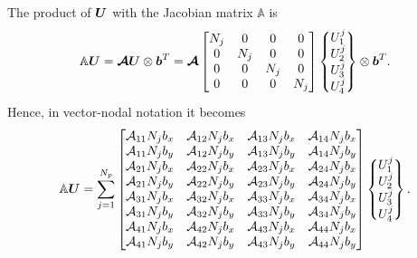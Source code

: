 \documentclass[a4paper,10pt]{article}
\newcommand{\bm}[1]{\text{\boldmath$#1$\unboldmath}}
\renewcommand{\b}{\bm{b}}
\newcommand{\DiscFunc}[1]{\bm{#1}}
\newcommand{\SecOrdTens}[1]{\bm{\mathcal{#1}}}
\renewcommand{\u}{\DiscFunc{U}}
\newcommand{\A}{\SecOrdTens{A}}
\newcommand{\tot}[1]{\mathbb{#1}}  %
\begin{document}
The product of $\u$ with the Jacobian matrix $\tot{A}$ is 
\[
 \tot{A} \u = \A \u\otimes \b^T = \A 
\begin{bmatrix}
                  N_j   &       0      &       0     &       0 \\ 
                  0     &      N_j     &       0     &       0 \\
                  0     &       0      &      N_j    &       0 \\
                  0     &       0      &       0     &       N_j 
                 \end{bmatrix}
                 \begin{Bmatrix}
                    U_1^j\\
                    U_2^j\\
                    U_3^j\\
                    U_4^j  
                 \end{Bmatrix}\otimes\b^T.
\]
Hence, in vector-nodal notation it becomes
\[
  \tot{A} \u = 
\sum_{j=1}^{N_p} \begin{bmatrix}
          \mathcal{A}_{11} N_jb_x   &  \mathcal{A}_{12} N_jb_x  & \mathcal{A}_{13} N_jb_x & \mathcal{A}_{14} N_jb_x  \\ 
          \mathcal{A}_{11} N_jb_y   &  \mathcal{A}_{12} N_jb_y  & \mathcal{A}_{13} N_jb_y & \mathcal{A}_{14} N_jb_y  \\  
          \mathcal{A}_{21} N_jb_x   &  \mathcal{A}_{22} N_jb_x  & \mathcal{A}_{23} N_jb_x & \mathcal{A}_{24} N_jb_x  \\ 
          \mathcal{A}_{21} N_jb_y   &  \mathcal{A}_{22} N_jb_y  & \mathcal{A}_{23} N_jb_y & \mathcal{A}_{24} N_jb_y  \\ 
          \mathcal{A}_{31} N_jb_x   &  \mathcal{A}_{32} N_jb_x  & \mathcal{A}_{33} N_jb_x & \mathcal{A}_{34} N_jb_x  \\ 
          \mathcal{A}_{31} N_jb_y   &  \mathcal{A}_{32} N_jb_y  & \mathcal{A}_{33} N_jb_y & \mathcal{A}_{34} N_jb_y  \\ 
          \mathcal{A}_{41} N_jb_x   &  \mathcal{A}_{42} N_jb_x  & \mathcal{A}_{43} N_jb_x & \mathcal{A}_{44} N_jb_x  \\ 
          \mathcal{A}_{41} N_jb_y   &  \mathcal{A}_{42} N_jb_y  & \mathcal{A}_{43} N_jb_y & \mathcal{A}_{44} N_jb_y            
                 \end{bmatrix}
                 \begin{Bmatrix}
                    U_1^j\\
                    U_2^j\\
                    U_3^j\\
                    U_4^j  
                 \end{Bmatrix}.
\]
\end{document}
